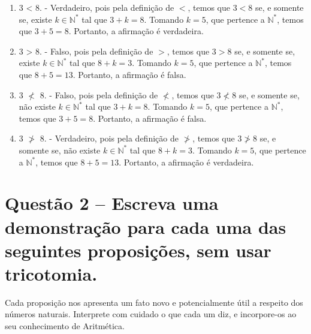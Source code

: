 \documentclass[12pt,a4paper]{article}
\begin{document}
    \begin{enumerate}[label= (\alph*)]
        \item  3 < 8. - Verdadeiro, pois pela definição de $<$, temos que $3 < 8$ se, e somente se, existe $k \in \mathbb{N}^*$ tal que $3 + k = 8$. 
        Tomando $k = 5$, que pertence a $\mathbb{N}^*$, temos que $3 + 5 = 8$. 
        Portanto, a afirmação é verdadeira.

        \vspace{0.5cm}

        \item 3 > 8. - Falso, pois pela definição de $>$, temos que $3 > 8$ se, e somente se, existe $k \in \mathbb{N}^*$ tal que $8 + k = 3$. 
        Tomando $k = 5$, que pertence a $\mathbb{N}^*$, temos que $8 + 5 = 13$. 
        Portanto, a afirmação é falsa.

        \vspace{0.5cm}

        \item 3 $\not<$ 8. - Falso, pois pela definição de $\not<$, temos que $3 \not< 8$ se, e somente se, não existe $k \in \mathbb{N}^*$ tal que $3 + k = 8$. 
        Tomando $k = 5$, que pertence a $\mathbb{N}^*$, temos que $3 + 5 = 8$. 
        Portanto, a afirmação é falsa.

        \vspace{0.5cm}

        \item 3 $\not>$ 8. - Verdadeiro, pois pela definição de $\not>$, temos que $3 \not> 8$ se, e somente se, não existe $k \in \mathbb{N}^*$ tal que $8 + k = 3$. 
        Tomando $k = 5$, que pertence a $\mathbb{N}^*$, temos que $8 + 5 = 13$. 
        Portanto, a afirmação é verdadeira.

    \end{enumerate}

\section*{Questão 2 -- Escreva uma demonstração para cada uma das seguintes proposições, sem usar tricotomia.}

    Cada proposição nos apresenta um fato novo e potencialmente útil a respeito dos números naturais.
    Interprete com cuidado o que cada um diz, e incorpore-os ao seu conhecimento de Aritmética.
\end{document}
